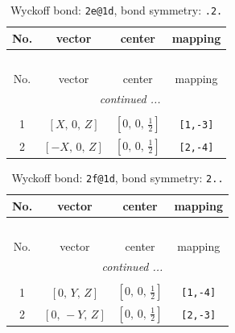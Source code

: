 \documentclass[fleqn,8pt]{jsarticle}
\begin{document}
\renewcommand{\arraystretch}{1.2}
\begin{longtable}{cccc}
\caption{Wyckoff bond: {\tt 2e@1d}, bond symmetry: {\tt .2.}}
 \\
 \hline \hline
No. & vector & center & mapping \\ \hline \endfirsthead

\multicolumn{3}{l}{\tablename\ \thetable{}} \\
 \hline \hline
No. & vector & center & mapping \\ \hline \endhead

 \hline \hline
\multicolumn{3}{r}{\footnotesize\it continued ...} \\ \endfoot

 \hline \hline
\multicolumn{3}{r}{} \\ \endlastfoot

1 & $\left[ X,\, 0,\, Z \right]$ & $\left[ 0,\, 0,\, \frac{1}{2} \right]$ & {\tt [1,-3]} \\ \hline
2 & $\left[ - X,\, 0,\, Z \right]$ & $\left[ 0,\, 0,\, \frac{1}{2} \right]$ & {\tt [2,-4]} \\
\end{longtable}
\renewcommand{\arraystretch}{1.2}
\begin{longtable}{cccc}
\caption{Wyckoff bond: {\tt 2f@1d}, bond symmetry: {\tt 2..}}
 \\
 \hline \hline
No. & vector & center & mapping \\ \hline \endfirsthead

\multicolumn{3}{l}{\tablename\ \thetable{}} \\
 \hline \hline
No. & vector & center & mapping \\ \hline \endhead

 \hline \hline
\multicolumn{3}{r}{\footnotesize\it continued ...} \\ \endfoot

 \hline \hline
\multicolumn{3}{r}{} \\ \endlastfoot

1 & $\left[ 0,\, Y,\, Z \right]$ & $\left[ 0,\, 0,\, \frac{1}{2} \right]$ & {\tt [1,-4]} \\ \hline
2 & $\left[ 0,\, - Y,\, Z \right]$ & $\left[ 0,\, 0,\, \frac{1}{2} \right]$ & {\tt [2,-3]} \\
\end{longtable}
\renewcommand{\arraystretch}{1.2}
\end{document}
